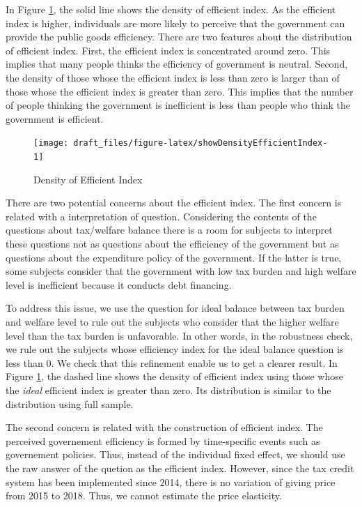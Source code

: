 \documentclass[ review  , 3p ]{elsarticle}
\begin{document}
  In Figure \ref{fig:showDensityEfficientIndex}, the solid line shows the density of efficient index.
  As the efficient index is higher,
  individuals are more likely to perceive that the government can provide the public goods efficiency.
  There are two features about the distribution of efficient index.
  First, the efficient index is concentrated around zero.
  This implies that many people thinks the efficiency of government is neutral.
  Second, the density of those whose the efficient index is less than zero is larger than of
  those whose the efficient index is greater than zero.
  This implies that the number of people thinking the government is inefficient is
  less than people who think the government is efficient.

  \begin{figure}[t]

  {\centering \texttt{[image: draft\_files/figure-latex/showDensityEfficientIndex-1]} 

  }

  \caption{Density of Efficient Index}\label{fig:showDensityEfficientIndex}
  \end{figure}

  There are two potential concerns about the efficient index.
  The first concern is related with a interpretation of question.
  Considering the contents of the questions about tax/welfare balance
  there is a room for subjects to interpret these questions
  not as questions about the efficiency of the government
  but as questions about the expenditure policy of the government.
  If the latter is true,
  some subjects consider that the government with low tax burden and high welfare level is inefficient because
  it conducts debt financing.

  To address this issue,
  we use the question for ideal balance between tax burden and welfare level
  to rule out the subjects who consider that the higher welfare level than the tax burden is unfavorable.
  In other words, in the robustness check,
  we rule out the subjects whose efficiency index for the ideal balance question is less than 0.
  We check that this refinement enable us to get a clearer result.
  In Figure \ref{fig:showDensityEfficientIndex},
  the dashed line shows the density of efficient index
  using those whose the \emph{ideal} efficient index is greater than zero.
  Its distribution is similar to the distribution using full sample.

  The second concern is related with the construction of efficient index.
  The perceived governement efficiency is formed by time-specific events such as governement policies.
  Thus, instead of the individual fixed effect,
  we should use the raw answer of the quetion as the efficient index.
  However, since the tax credit system has been implemented since 2014,
  there is no variation of giving price from 2015 to 2018.
  Thus, we cannot estimate the price elasticity.
\end{document}
